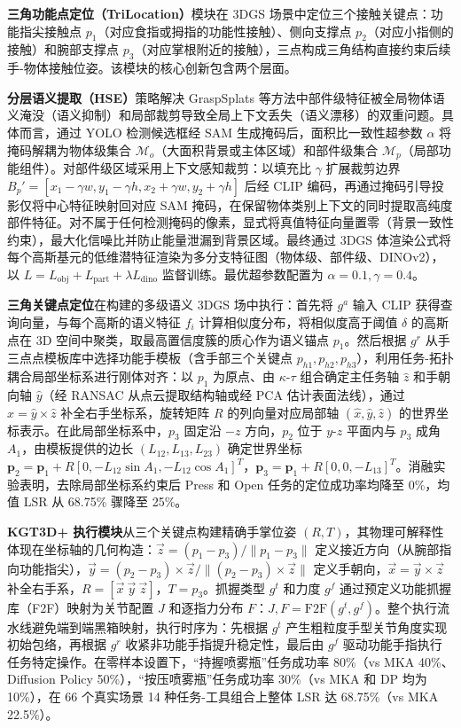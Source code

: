 \textbf{三角功能点定位（TriLocation）}模块在 3DGS 场景中定位三个接触关键点：功能指尖接触点 $p_1$（对应食指或拇指的功能性接触）、侧向支撑点 $p_2$（对应小指侧的接触）和腕部支撑点 $p_3$（对应掌根附近的接触），三点构成三角结构直接约束后续手-物体接触位姿。该模块的核心创新包含两个层面。

\textbf{分层语义提取（HSE）}策略解决 GraspSplats 等方法中部件级特征被全局物体语义淹没（语义抑制）和局部裁剪导致全局上下文丢失（语义漂移）的双重问题。具体而言，通过 YOLO 检测候选框经 SAM 生成掩码后，面积比一致性超参数 $\alpha$ 将掩码解耦为物体级集合 $\mathcal{M}_o$（大面积背景或主体区域）和部件级集合 $\mathcal{M}_p$（局部功能组件）。对部件级区域采用上下文感知裁剪：以填充比 $\gamma$ 扩展裁剪边界 $B_p'=[x_1-\gamma w, y_1-\gamma h, x_2+\gamma w, y_2+\gamma h]$ 后经 CLIP 编码，再通过掩码引导投影仅将中心特征映射回对应 SAM 掩码，在保留物体类别上下文的同时提取高纯度部件特征。对不属于任何检测掩码的像素，显式将真值特征向量置零（背景一致性约束），最大化信噪比并防止能量泄漏到背景区域。最终通过 3DGS 体渲染公式将每个高斯基元的低维潜特征渲染为多分支特征图（物体级、部件级、DINOv2），以 $L = L_\text{obj} + L_\text{part} + \lambda L_\text{dino}$ 监督训练。最优超参数配置为 $\alpha=0.1, \gamma=0.4$。

\textbf{三角关键点定位}在构建的多级语义 3DGS 场中执行：首先将 $g^a$ 输入 CLIP 获得查询向量，与每个高斯的语义特征 $f_i$ 计算相似度分布，将相似度高于阈值 $\delta$ 的高斯点在 3D 空间中聚类，取最高置信度簇的质心作为语义锚点 $p_1$。然后根据 $g^r$ 从手三点点模板库中选择功能手模板（含手部三个关键点 $p_{h1}, p_{h2}, p_{h3}$），利用任务-拓扑耦合局部坐标系进行刚体对齐：以 $p_1$ 为原点、由 $\kappa$-$\tau$ 组合确定主任务轴 $\hat{z}$ 和手朝向轴 $\hat{y}$（经 RANSAC 从点云提取结构轴或经 PCA 估计表面法线），通过 $\hat{x} = \hat{y} \times \hat{z}$ 补全右手坐标系，旋转矩阵 $R$ 的列向量对应局部轴 $(\hat{x}, \hat{y}, \hat{z})$ 的世界坐标表示。在此局部坐标系中，$p_3$ 固定沿 $-z$ 方向，$p_2$ 位于 $y$-$z$ 平面内与 $p_3$ 成角 $A_1$，由模板提供的边长 $(L_{12}, L_{13}, L_{23})$ 确定世界坐标 $\mathbf{p}_2 = \mathbf{p}_1 + R[0, -L_{12}\sin A_1, -L_{12}\cos A_1]^T$，$\mathbf{p}_3 = \mathbf{p}_1 + R[0, 0, -L_{13}]^T$。消融实验表明，去除局部坐标系约束后 Press 和 Open 任务的定位成功率均降至 0\%，均值 LSR 从 68.75\% 骤降至 25\%。

\textbf{KGT3D+ 执行模块}从三个关键点构建精确手掌位姿 $(R, T)$，其物理可解释性体现在坐标轴的几何构造：$\vec{z} = (p_1 - p_3)/\|p_1 - p_3\|$ 定义接近方向（从腕部指向功能指尖），$\vec{y} = (p_2 - p_3) \times \vec{z}/\|(p_2 - p_3) \times \vec{z}\|$ 定义手朝向，$\vec{x} = \vec{y} \times \vec{z}$ 补全右手系，$R = [\vec{x}\ \vec{y}\ \vec{z}]$，$T = p_3$。抓握类型 $g^t$ 和力度 $g^f$ 通过预定义功能抓握库（F2F）映射为关节配置 $J$ 和逐指力分布 $F$：$J, F = \text{F2F}(g^t, g^f)$。整个执行流水线避免端到端黑箱映射，执行时序为：先根据 $g^t$ 产生粗粒度手型关节角度实现初始包络，再根据 $g^r$ 收紧非功能手指提升稳定性，最后由 $g^f$ 驱动功能手指执行任务特定操作。在零样本设置下，``持握喷雾瓶''任务成功率 80\%（vs MKA 40\%、Diffusion Policy 50\%），``按压喷雾瓶''任务成功率 30\%（vs MKA 和 DP 均为 10\%），在 66 个真实场景 14 种任务-工具组合上整体 LSR 达 68.75\%（vs MKA 22.5\%）。

